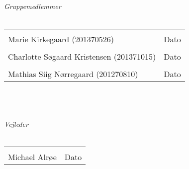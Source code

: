\begin{vplace}[0.6]
{\large \textit{Gruppemedlemmer}}
\\
\\

\noindent \begin{tabular}{ll}
	\makebox[3.0in]{\hrulefill} & \makebox[1.5in]{\hrulefill}\\
	Marie Kirkegaard (201370526) & Dato\\[8ex]%
	\makebox[3in]{\hrulefill} & \makebox[1.5in]{\hrulefill}\\
	Charlotte Søgaard Kristensen (201371015) & Dato\\[8ex]
	\makebox[3in]{\hrulefill} & \makebox[1.5in]{\hrulefill}\\
	Mathias Siig Nørregaard (201270810) & Dato\\[8ex]
\end{tabular}
\\
\\
\\
{\large \textit{Vejleder}}
\\
\\

\noindent \begin{tabular}{ll}
	\makebox[3.0in]{\hrulefill} & \makebox[1.5in]{\hrulefill}\\
	Michael Alrøe & Dato\\[8ex]
\end{tabular}
\end{vplace}

